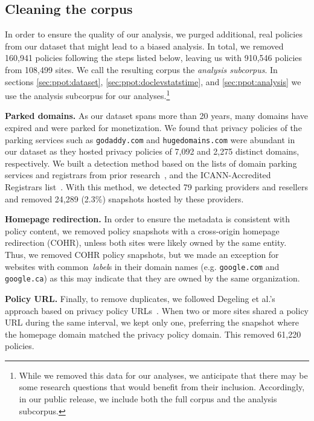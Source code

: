 \subsection{Cleaning the corpus}
\label{sec:ppot:deduplication}
In order to ensure the quality of our analysis, we purged additional, real policies from our dataset that might lead to a biased analysis. In total, we removed 160,941 policies following the steps listed below, leaving us with 910,546 policies from 108,499 sites. We call the resulting corpus the \textit{analysis subcorpus}. In sections \ref{sec:ppot:dataset}, \ref{sec:ppot:doclevstatstime}, and \ref{sec:ppot:analysis} we use the analysis subcorpus for our analyses.\footnote{While we removed this data for our analyses, we anticipate that there may be some research questions that would benefit from their inclusion. Accordingly, in our public release, we include both the full corpus and the analysis subcorpus.} 

\textbf{Parked domains.} As our dataset spans more than 20 years,
many domains have expired and were parked for monetization.
We found that privacy policies of the parking services such as {\tt godaddy.com} and {\tt hugedomains.com} were abundant in our dataset as they hosted privacy policies of 7,092 and 2,275 distinct domains, respectively.
We built a detection method based on the lists of domain parking services and registrars from prior research~\cite{vissers2015parking, kuhrer2014paint, kuhrer2014paint-TR, wang2006strider},
and the ICANN-Accredited Registrars list~\cite{ICANN-Registrars}.
With this method, we detected 79 parking providers and resellers and removed 24,289 (2.3\%) snapshots hosted by these providers.
 
\textbf{Homepage redirection.} In order to ensure the metadata is consistent with policy content, we removed policy snapshots with a cross-origin homepage redirection (COHR), unless both sites were likely owned by the same entity. Thus, we removed COHR policy snapshots, but we made an exception for websites with
common~\emph{label}s in their domain names (e.g. \texttt{google.com} and \texttt{google.ca})
as this may indicate that they are owned by the same organization.

\textbf{Policy URL.} Finally, to remove duplicates, we followed
Degeling et al.'s approach based on privacy policy URLs~\cite{degeling2018we}. When two or more sites shared a policy URL during the same interval, we kept only one, preferring the snapshot where the homepage domain matched the privacy policy domain. This removed 61,220 policies.



